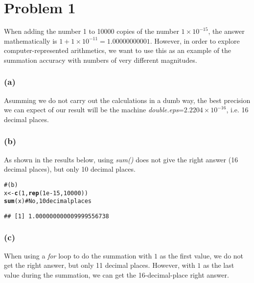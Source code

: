 \documentclass{article}\usepackage{graphicx, color}
\makeatletter
\newcommand{\hlfunctioncall}[1]{\textcolor[rgb]{0.501960784313725,0,0.329411764705882}{\textbf{#1}}}%
\newcommand{\hlcomment}[1]{\textcolor[rgb]{0.180392156862745,0.6,0.341176470588235}{#1}}%
\newenvironment{kframe}{%
 \def\at@end@of@kframe{}%
 \ifinner\ifhmode%
  \def\at@end@of@kframe{\end{minipage}}%
  \begin{minipage}{\columnwidth}%
 \fi\fi%
 \def\FrameCommand##1{\hskip\@totalleftmargin \hskip-\fboxsep
 \colorbox{shadecolor}{##1}\hskip-\fboxsep
     \hskip-\linewidth \hskip-\@totalleftmargin \hskip\columnwidth}%
 \MakeFramed {\advance\hsize-\width
   \@totalleftmargin\z@ \linewidth\hsize
   \@setminipage}}%
 {\par\unskip\endMakeFramed%
 \at@end@of@kframe}
\newenvironment{knitrout}{}{} %
\makeatother
\begin{document}
\section*{Problem 1}

When adding the number 1 to 10000 copies of the number $1 \times 10^{-15}$, the answer mathematically is \newline
$1 + 1 \times 10^{-11} = 1.00000000001$. However, in order to explore computer-represented arithmetics, 
we want to use this as an example of the summation accuracy with numbers of very different magnitudes.

\subsubsection*{(a)}
Asumming we do not carry out the calculations in a dumb way, the best precision we can expect of our result
will be the machine \textit{double.eps}=$2.2204\times 10^{-16}$, i.e. 16 decimal places.




\subsubsection*{(b)}
As shown in the results below, using \textit{sum()} does not give the right answer (16 decimal places), but only
10 decimal places.

\begin{knitrout}
\color{fgcolor}\begin{kframe}
\begin{alltt}
\hlcomment{# (b)}
x <- \hlfunctioncall{c}(1, \hlfunctioncall{rep}(1e-15, 10000))
\hlfunctioncall{sum}(x)  \hlcomment{# No, 10 decimal places}
\end{alltt}
\begin{verbatim}
## [1] 1.000000000009999556738
\end{verbatim}
\end{kframe}
\end{knitrout}


\subsubsection*{(c)}
When using a \textit{for} loop to do the summation with $1$ as the first value, we do not get the right answer,
but only 11 decimal places. However, with $1$ as the last value during the summation, we can get the 16-decimal-place
right answer.
\end{document}
